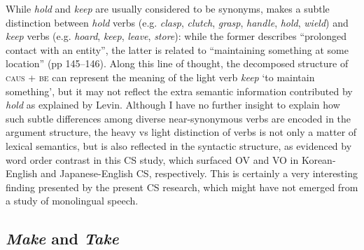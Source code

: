 While \textit{hold} and \textit{keep} are usually considered to be synonyms, \citet{Levin1993} makes a subtle distinction between \textit{hold} verbs (e.g. \textit{clasp}, \textit{clutch}, \textit{grasp}, \textit{handle}, \textit{hold}, \textit{wield}) and \textit{keep} verbs (e.g. \textit{hoard}, \textit{keep}, \textit{leave}, \textit{store}): while the former describes “prolonged contact with an entity”, the latter is related to “maintaining something at some location” (pp 145--146). Along this line of thought, the decomposed structure of \textsc{caus} \textsc{+} \textsc{be} can represent the meaning of the light verb \textit{keep} ‘to maintain something’, but it may not reflect the extra semantic information contributed by \textit{hold} as explained by Levin. Although I have no further insight to explain how such subtle differences among diverse near-synonymous verbs are encoded in the argument structure, the heavy vs light distinction of verbs is not only a matter of lexical semantics, but is also reflected in the syntactic structure, as evidenced by word order contrast in this \ac{CS} study, which surfaced \ac{OV} and \ac{VO} in Korean-English and Japanese-English \ac{CS}, respectively. This is certainly a very interesting finding presented by the present \ac{CS} research, which might have not emerged from a study of monolingual speech.

\subsection{\textit{Make} and \textit{Take}}\label{ch5:sect:5.7.5}

\begin{table}[b]
\caption{Item-based analysis for \textit{make} in Korean-English code-switching
(n$^0$ of occurrence 0–4: OV biased; 5–9: not biased; 10–14: VO biased)
}
\label{tab:5.7}
\end{table}

